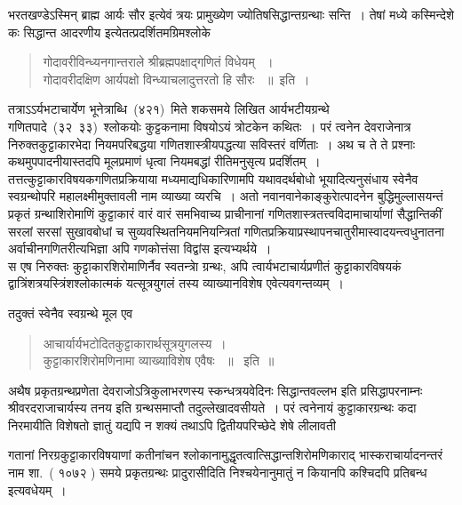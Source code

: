 \documentclass[11pt, openany]{book}
\begin{document}
\indent
भरतखण्डेऽस्मिन् ब्राह्म आर्यः सौर इत्येवं त्रयः प्रामुख्येण ज्योतिषसिद्धान्तग्रन्थाः सन्ति~। तेषां मध्ये कस्मिन्देशे कः सिद्धान्त आदरणीय इत्येतत्प्रदर्शितमग्रिमश्लोके \textendash

\begin{quote}
{\qt गोदावरीविन्ध्यनगान्तराले श्रीब्रह्मपक्षाद्गणितं विधेयम् ~।\\
गोदावरीदक्षिण आर्यपक्षो विन्ध्याचलादुत्तरतो हि सौरः ~॥~इति~।}
\end{quote}


\indent
तत्राऽऽर्यभटाचार्येण भूनेत्राब्धि~(४२१)~मिते शकसमये लिखित आर्यभटीयग्रन्थे गणितपादे~(३२\textendash\ ३३)~श्लोकयोः कुट्टकनामा विषयोऽयं त्रोटकेन कथितः~। परं त्वनेन देवराजेनात्र निरुक्तकुट्टाकारभेदा नियमपरिबद्धया गणितशास्त्रीयपद्धत्या सविस्तरं वर्णिताः~। अथ च ते ते प्रश्नाः कथमुपपादनीयास्तदपि मूलप्रमाणं धृत्वा नियमबद्धां रीतिमनुसृत्य प्रदर्शितम्~।तत्तत्कुट्टाकारविषयकगणितप्रक्रियाया मध्यमाद्यधिकारिणामपि यथावदर्थबोधो भूयादित्यनुसंधाय स्वेनैव स्वग्रन्थोपरि महालक्ष्मीमुक्तावली नाम व्याख्या व्यरचि~। अतो नवानवानेकाङ्कुराेत्पादनेन बुद्धिमुल्लासयन्तं प्रकृतं ग्रन्थाशिरोमाणिं कुट्टाकारं वारं वारं समभिवाच्य प्राचीनानां गणितशास्त्रतत्त्वविदामाचार्याणां सैद्धान्तिकीं सरलां सरसां सुखावबोधां च सुव्यवस्थितनियमनियन्त्रितां गणितप्रक्रियाप्रस्थापनचातुरीमास्वादयन्त्वधुनातना अर्वाचीनगणितरीत्यभिज्ञा अपि गणकोत्तंसा विद्वांस इत्यभ्यर्थये~।\\



\indent
स एष निरुक्तः कुट्टाकारशिरोमाणिर्नैव स्वतन्त्राे ग्रन्थः, अपि त्वार्यभटाचार्यप्रणीतं कुट्टाकारविषयकं द्वात्रिंशत्रयस्त्रिंशश्लोकात्मकं यत्सूत्रयुगलं तस्य व्याख्यानविशेष एवेत्यवगन्तव्यम्~। 

तदुक्तं स्वेनैव स्वग्रन्थे मूल एव\textendash

\begin{quote}
{\qt आचार्यार्यभटोदितकुट्टाकारार्थसूत्रयुगलस्य~।\\
कुट्टाकारशिरोमणिनामा व्याख्याविशेष एवैषः ~॥~ इति~॥}\\
\end{quote}

\indent
अथैष प्रकृतग्रन्थप्रणेता देवराजोऽत्रिकुलाभरणस्य स्कन्धत्रयवेदिनः सिद्धान्तवल्लभ इति प्रसिद्धापरनाम्नः श्रीवरदराजाचार्यस्य तनय इति ग्रन्थसमाप्तौ तदुल्लेखादवसीयते~। परं त्वनेनायं कुट्टाकारग्रन्थः कदा निरमायीति विशेषतो ज्ञातुं यद्यपि न शक्यं तथाऽपि द्वितीयपरिच्छेदे शेषे लीलावती \textendash

\newpage
\thispagestyle{fancy}
\fancyhf{}
\chead{\textbf{[३]}}
\noindent
गतानां निरग्रकुट्टाकारविषयाणां कतीनांचन श्लोकानामुद्धृतत्वात्सिद्धान्तशिरोमणिकाराद् भास्कराचार्यादनन्तरं नाम शा.~( १०७२ ) समये प्रकृतग्रन्थः प्रादुरासीदिति निश्चयेनानुमातुं न कियानपि कश्चिदपि प्रतिबन्ध इत्यवधेयम्~।\\
\end{document}
